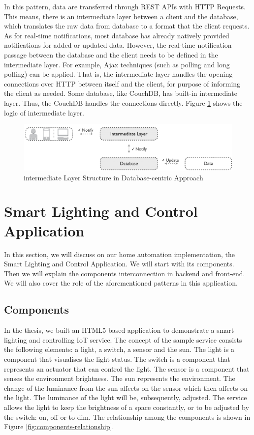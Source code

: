 In this pattern, data are transferred through REST APIs with HTTP Requests. This means, there is an intermediate layer between a client and the database, which translates the raw data from database to a format that the client requests. As for real-time notifications, most database has already natively provided notifications for added or updated data. However, the real-time notification passage between the database and the client needs to be defined in the intermediate layer. For example, Ajax techniques (such as polling and long polling) can be applied. That is, the intermediate layer handles the opening connections over HTTP between itself and the client, for purpose of informing the client as needed. Some database, like CouchDB, has built-in intermediate layer. Thus, the CouchDB handles the connections directly. Figure \ref{fig:intermediate-layer} shows the logic of intermediate layer.

\begin{figure}[t]
  \begin{center}
    \includegraphics[width=1\textwidth]{images/intermediate-layer.pdf}
    \caption{intermediate Layer Structure in Database-centric Approach}
    \label{fig:intermediate-layer}
  \end{center}
\end{figure}

\section{Smart Lighting and Control Application}

In this section, we will discuss on our home automation implementation, the Smart Lighting and Control Application. We will start with its components. Then we will explain the components interconnection in backend and front-end. We will also cover the role of the aforementioned patterns in this application.

\subsection{Components}
In the thesis, we built an HTML5 based application to demonstrate a smart lighting and controlling IoT service. The concept of the sample service consists the following elements: a light, a switch, a sensor and the sun. The light is a component that visualises the light status. The switch is a component that represents an actuator that can control the light. The sensor is a component that senses the environment brightness. The sun represents the environment. The change of the luminance from the sun affects on the sensor which then affects on the light. The luminance of the light will be, subsequently, adjusted. The service allows the light to keep the brightness of a space constantly, or to be adjusted by the switch: on, off or to dim. The relationship among the components is shown in Figure \ref{fig:components-relationship}. 

